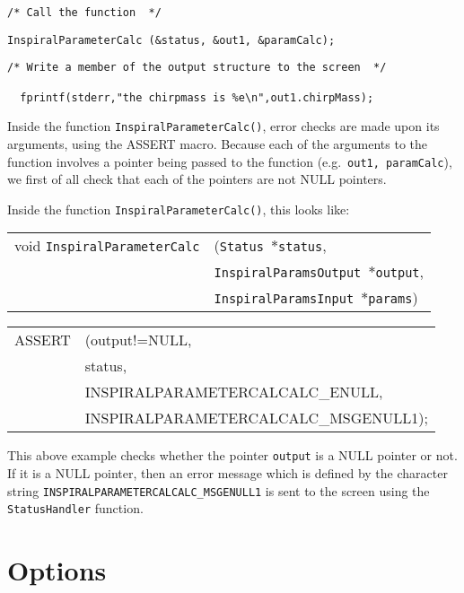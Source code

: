 \documentclass[12pt]{article}
\begin{document}
\begin{verbatim}
/* Call the function  */
\end{verbatim}
\texttt{InspiralParameterCalc (\&status, \&out1, \&paramCalc);}
\begin{verbatim}
/* Write a member of the output structure to the screen  */ 

  fprintf(stderr,"the chirpmass is %e\n",out1.chirpMass); 
\end{verbatim}


Inside the function \texttt{InspiralParameterCalc()}, error checks are made upon its arguments, using the ASSERT macro. Because each of the arguments to the function involves a pointer being passed to the function (e.g.\ \texttt{out1, paramCalc}), we first of all check that each of the pointers are not NULL pointers.

Inside the function \texttt{InspiralParameterCalc()}, this looks like:

\vspace{5mm}

\begin{tabular}{ll}
void \texttt{InspiralParameterCalc}&(\texttt{Status $\ast$status},     \\
                                   &\texttt{InspiralParamsOutput $\ast$output}, \\
                                   &\texttt{InspiralParamsInput $\ast$params})
\end{tabular}

\vspace{5mm}

\begin{tabular}{ll}
ASSERT & (output!=NULL,  \\
       &  status,    \\
       &  INSPIRALPARAMETERCALCALC\_ENULL, \\
       &  INSPIRALPARAMETERCALCALC\_MSGENULL1);
\end{tabular}

\vspace{5mm}

This above example checks whether the pointer \texttt{output} is a NULL pointer or not. If it is a NULL pointer, then an error message which is defined by the character string \texttt{INSPIRALPARAMETERCALCALC\_MSGENULL1} is sent to the screen using the \texttt{StatusHandler} function.


\section{Options}
\end{document}

